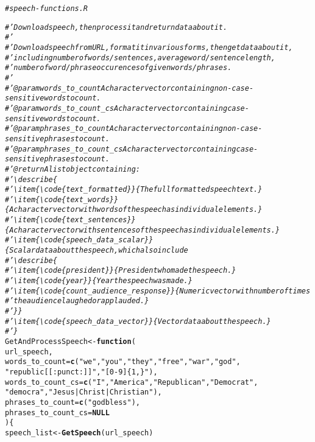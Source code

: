 \documentclass{article}\usepackage[]{graphicx}\usepackage[]{color}
\makeatletter
\newcommand{\hlstr}[1]{\textcolor[rgb]{0.192,0.494,0.8}{#1}}%
\newcommand{\hlcom}[1]{\textcolor[rgb]{0.678,0.584,0.686}{\textit{#1}}}%
\newcommand{\hlstd}[1]{\textcolor[rgb]{0.345,0.345,0.345}{#1}}%
\newcommand{\hlkwa}[1]{\textcolor[rgb]{0.161,0.373,0.58}{\textbf{#1}}}%
\newcommand{\hlkwb}[1]{\textcolor[rgb]{0.69,0.353,0.396}{#1}}%
\newcommand{\hlkwc}[1]{\textcolor[rgb]{0.333,0.667,0.333}{#1}}%
\newcommand{\hlkwd}[1]{\textcolor[rgb]{0.737,0.353,0.396}{\textbf{#1}}}%
\newenvironment{kframe}{%
 \def\at@end@of@kframe{}%
 \ifinner\ifhmode%
  \def\at@end@of@kframe{\end{minipage}}%
  \begin{minipage}{\columnwidth}%
 \fi\fi%
 \def\FrameCommand##1{\hskip\@totalleftmargin \hskip-\fboxsep
 \colorbox{shadecolor}{##1}\hskip-\fboxsep
     \hskip-\linewidth \hskip-\@totalleftmargin \hskip\columnwidth}%
 \MakeFramed {\advance\hsize-\width
   \@totalleftmargin\z@ \linewidth\hsize
   \@setminipage}}%
 {\par\unskip\endMakeFramed%
 \at@end@of@kframe}
\newenvironment{knitrout}{}{} %
\makeatother
\begin{document}
\begin{knitrout}
\color{fgcolor}\begin{kframe}
\begin{alltt}
\hlcom{# speech-functions.R}

\hlcom{#' Download speech, then process it and return data about it.}
\hlcom{#' }
\hlcom{#' Download speech from URL, format it in various forms, then get data about it, }
\hlcom{#' including number of words/sentences, average word/sentence length, }
\hlcom{#' number of word/phrase occurences of given words/phrases.}
\hlcom{#' }
\hlcom{#' @param words_to_count A character vector containing non-case-sensitive words to count.}
\hlcom{#' @param words_to_count_cs A character vector containing case-sensitive words to count.}
\hlcom{#' @param phrases_to_count A character vector containing non-case-sensitive phrases to count.}
\hlcom{#' @param phrases_to_count_cs A character vector containing case-sensitive phrases to count.}
\hlcom{#' @return A list object containing: }
\hlcom{#' \textbackslash{}describe\{}
\hlcom{#'   \textbackslash{}item\{\textbackslash{}code\{text_formatted\}\}\{The full formatted speech text.\}}
\hlcom{#'   \textbackslash{}item\{\textbackslash{}code\{text_words\}\}\{A character vector with words of the speech as individual elements.\}}
\hlcom{#'   \textbackslash{}item\{\textbackslash{}code\{text_sentences\}\}\{A character vector with sentences of the speech as individual elements.\}}
\hlcom{#'   \textbackslash{}item\{\textbackslash{}code\{speech_data_scalar\}\}\{Scalar data about the speech, which also include}
\hlcom{#'   \textbackslash{}describe\{}
\hlcom{#'      \textbackslash{}item\{\textbackslash{}code\{president\}\}\{President who made the speech.\}}
\hlcom{#'      \textbackslash{}item\{\textbackslash{}code\{year\}\}\{Year the speech was made.\}}
\hlcom{#'      \textbackslash{}item\{\textbackslash{}code\{count_audience_response\}\}\{Numeric vector with number of times}
\hlcom{#'      the audience laughed or applauded.\}}
\hlcom{#'   \}\}}
\hlcom{#'   \textbackslash{}item\{\textbackslash{}code\{speech_data_vector\}\}\{Vector data about the speech.\}}
\hlcom{#' \}}
\hlstd{GetAndProcessSpeech} \hlkwb{<-} \hlkwa{function}\hlstd{(}
  \hlkwc{url_speech}\hlstd{,}
  \hlkwc{words_to_count} \hlstd{=} \hlkwd{c}\hlstd{(}\hlstr{"we"}\hlstd{,} \hlstr{"you"}\hlstd{,} \hlstr{"they"}\hlstd{,} \hlstr{"free"}\hlstd{,} \hlstr{"war"}\hlstd{,} \hlstr{"god"}\hlstd{,}
                     \hlstr{"republic[[:punct:] ]"}\hlstd{,} \hlstr{"[0-9]\{1,\}"}\hlstd{),}
  \hlkwc{words_to_count_cs} \hlstd{=} \hlkwd{c}\hlstd{(}\hlstr{"I"}\hlstd{,} \hlstr{"America"}\hlstd{,} \hlstr{"Republican"}\hlstd{,} \hlstr{"Democrat"}\hlstd{,}
                        \hlstr{"democra"}\hlstd{,} \hlstr{"Jesus|Christ|Christian"}\hlstd{),}
  \hlkwc{phrases_to_count} \hlstd{=} \hlkwd{c}\hlstd{(}\hlstr{"god bless"}\hlstd{),}
  \hlkwc{phrases_to_count_cs} \hlstd{=} \hlkwa{NULL}
\hlstd{) \{}
  \hlstd{speech_list} \hlkwb{<-} \hlkwd{GetSpeech}\hlstd{(url_speech)}


\end{alltt}
\end{kframe}
\end{knitrout}
\end{document}
